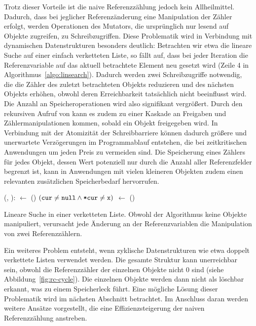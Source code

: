 Trotz dieser Vorteile ist die naive Referenzzählung jedoch kein Allheilmittel.
Dadurch, dass bei jeglicher Referenzänderung eine Manipulation der Zähler erfolgt, werden Operationen des Mutators, die ursprünglich nur lesend auf Objekte zugreifen, zu Schreibzugriffen.
Diese Problematik wird in Verbindung mit dynamischen Datenstrukturen besonders deutlich:
Betrachten wir etwa die lineare Suche auf einer einfach verketteten Liste, so fällt auf, dass bei jeder Iteration die Referenzvariable auf das aktuell betrachtete Element neu gesetzt wird (Zeile 4 in Algorithmus~\ref{algo:linsearch}).
Dadurch werden zwei Schreibzugriffe notwendig, die die Zähler des zuletzt betrachteten Objekts reduzieren und des nächsten Objekts erhöhen, obwohl deren Erreichbarkeit tatsächlich nicht beeinflusst wird.
Die Anzahl an Speicheroperationen wird also signifikant vergrößert.
Durch den rekursiven Aufruf von  kann es zudem zu einer Kaskade an Freigaben und Zählermanipulationen kommen, sobald ein Objekt freigegeben wird.
In Verbindung mit der Atomizität der Schreibbarriere können dadurch größere und unerwartete Verzögerungen im Programmablauf entstehen, die bei zeitkritischen Anwendungen um jeden Preis zu vermeiden sind.
Die Speicherung eines Zählers für jedes Objekt, dessen Wert potenziell nur durch die Anzahl aller Referenzfelder begrenzt ist, kann in Anwendungen mit vielen kleineren Objekten zudem einen relevanten zusätzlichen Speicherbedarf hervorrufen.

\begin{algorithm}[h]
\begin{algorithmic}[1]
	\State {}(, ):
	\State \quad {} $\gets$ ()
	\State \quad \WHILE $(\texttt{cur} \neq \texttt{null} \wedge \texttt{*cur} \neq \texttt{x})$
	\State \quad \quad {} $\gets$ ()
	\State \quad \Return {} 
\end{algorithmic}
\caption[Lineare Suche]{Lineare Suche in einer verketteten Liste. Obwohl der Algorithmus keine Objekte manipuliert, verursacht jede Änderung an der Referenzvariablen  die Manipulation von zwei Referenzzählern.}
\label{algo:linsearch}
\end{algorithm}

Ein weiteres Problem entsteht, wenn zyklische Datenstrukturen wie etwa doppelt verkettete Listen verwendet werden.
Die gesamte Struktur kann unerreichbar sein, obwohl die Referenzzähler der einzelnen Objekte nicht $0$ sind (siehe Abbildung~\ref{fig:rc-cycle}).
Die einzelnen Objekte werden dann nicht als löschbar erkannt, was zu einem Speicherleck führt.
Eine mögliche Lösung dieser Problematik wird im nächsten Abschnitt betrachtet.
Im Anschluss daran werden weitere Ansätze vorgestellt, die eine Effizienzsteigerung der naiven Referenzzählung anstreben.


